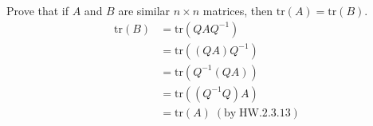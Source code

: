 Prove that if $A$ and $B$ are similar $n\times n$ matrices, then
$\text{tr}(A)= \text{tr}(B)$.
\begin{align}
\text{tr}(B) &= \text{tr}(QAQ^{-1})\\
&= \text{tr}((QA)Q^{-1})\\
&= \text{tr}(Q^{-1}(QA))\\
&= \text{tr}((Q^{-1}Q)A)\\
&= \text{tr}(A) \; (\text{by}\; \text{HW}.2.3.13)
\end{align}
